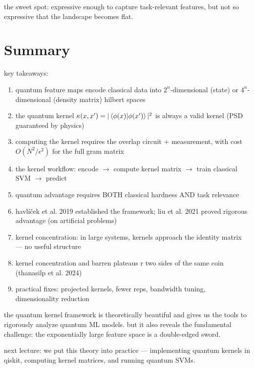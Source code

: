 \documentclass[11pt,a4paper]{article}
\theoremstyle{definition}
\theoremstyle{remark}
\begin{document}
the sweet spot: expressive enough to capture task-relevant features, but not so expressive that the landscape becomes flat.

\section{Summary}

key takeaways:

\begin{enumerate}
    \item quantum feature maps encode classical data into $2^n$-dimensional (state) or $4^n$-dimensional (density matrix) hilbert spaces
    \item the quantum kernel $\kappa(x,x') = |\braket{\phi(x)|\phi(x')}|^2$ is always a valid kernel (PSD guaranteed by physics)
    \item computing the kernel requires the overlap circuit + measurement, with cost $O(N^2/\epsilon^2)$ for the full gram matrix
    \item the kernel workflow: encode $\to$ compute kernel matrix $\to$ train classical SVM $\to$ predict
    \item quantum advantage requires BOTH classical hardness AND task relevance
    \item havl\'i\v{c}ek et al. 2019 established the framework; liu et al. 2021 proved rigorous advantage (on artificial problems)
    \item kernel concentration: in large systems, kernels approach the identity matrix --- no useful structure
    \item kernel concentration and barren plateaus r two sides of the same coin (thanasilp et al. 2024)
    \item practical fixes: projected kernels, fewer reps, bandwidth tuning, dimensionality reduction
\end{enumerate}

the quantum kernel framework is theoretically beautiful and gives us the tools to rigorously analyze quantum ML models. but it also reveals the fundamental challenge: the exponentially large feature space is a double-edged sword.

next lecture: we put this theory into practice --- implementing quantum kernels in qiskit, computing kernel matrices, and running quantum SVMs.
\end{document}
